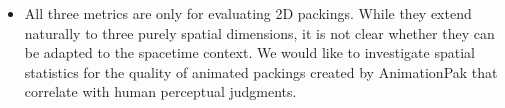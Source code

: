 \begin{itemize}
\item All three metrics are only for evaluating 2D packings.
  While they extend naturally to three purely spatial
  dimensions, it is not clear whether they can be 
  adapted to the spacetime context.  
  We would like to investigate
  spatial statistics for the quality of animated packings created by AnimationPak that correlate
  with human perceptual judgments.

\end{itemize}



